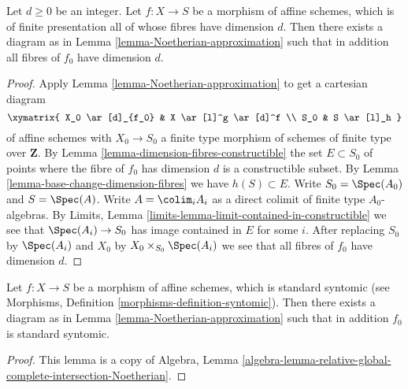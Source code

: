 \begin{lemma}
\label{lemma-Noetherian-approximation-dimension-d}
Let $d \geq 0$ be an integer.
Let $f : X \to S$ be a morphism of affine schemes, which is
of finite presentation all of whose fibres have dimension $d$.
Then there exists a diagram as in
Lemma \ref{lemma-Noetherian-approximation}
such that in addition all fibres of $f_0$ have dimension $d$.
\end{lemma}

\begin{proof}
Apply
Lemma \ref{lemma-Noetherian-approximation}
to get a cartesian diagram
$$
\xymatrix{
X_0 \ar[d]_{f_0} & X \ar[l]^g \ar[d]^f \\
S_0 & S \ar[l]_h
}
$$
of affine schemes with $X_0 \to S_0$ a finite type morphism of
schemes of finite type over $\mathbf{Z}$. By
Lemma \ref{lemma-dimension-fibres-constructible}
the set $E \subset S_0$ of points where the fibre of
$f_0$ has dimension $d$ is a constructible subset. By
Lemma \ref{lemma-base-change-dimension-fibres}
we have $h(S) \subset E$. Write $S_0 = \Spec(A_0)$ and
$S = \Spec(A)$. Write $A = \colim_i A_i$ as a
direct colimit of finite type $A_0$-algebras. By
Limits, Lemma \ref{limits-lemma-limit-contained-in-constructible}
we see that $\Spec(A_i) \to S_0$ has image contained in $E$
for some $i$. After replacing $S_0$ by $\Spec(A_i)$ and
$X_0$ by $X_0 \times_{S_0} \Spec(A_i)$ we see that
all fibres of $f_0$ have dimension $d$.
\end{proof}

\begin{lemma}
\label{lemma-Noetherian-approximation-standard-syntomic}
Let $f : X \to S$ be a morphism of affine schemes, which is
standard syntomic (see
Morphisms, Definition \ref{morphisms-definition-syntomic}).
Then there exists a diagram as in
Lemma \ref{lemma-Noetherian-approximation}
such that in addition $f_0$ is standard syntomic.
\end{lemma}

\begin{proof}
This lemma is a copy of
Algebra,
Lemma \ref{algebra-lemma-relative-global-complete-intersection-Noetherian}.
\end{proof}

